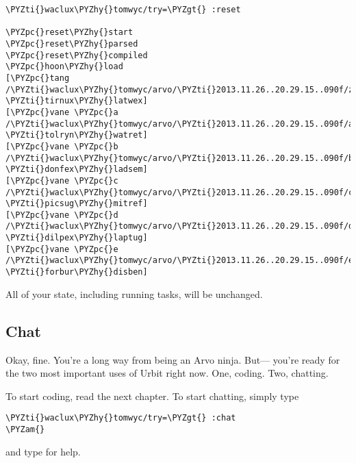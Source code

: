 \begin{framed_shaded}
\begin{Verbatim}[fontsize=\relsize{-2.5},fontseries=b,commandchars=\\\{\}]
\PYZti{}waclux\PYZhy{}tomwyc/try=\PYZgt{} :reset

\PYZpc{}reset\PYZhy{}start
\PYZpc{}reset\PYZhy{}parsed
\PYZpc{}reset\PYZhy{}compiled
\PYZpc{}hoon\PYZhy{}load
[\PYZpc{}tang /\PYZti{}waclux\PYZhy{}tomwyc/arvo/\PYZti{}2013.11.26..20.29.15..090f/zuse \PYZti{}tirnux\PYZhy{}latwex]
[\PYZpc{}vane \PYZpc{}a /\PYZti{}waclux\PYZhy{}tomwyc/arvo/\PYZti{}2013.11.26..20.29.15..090f/ames \PYZti{}tolryn\PYZhy{}watret]
[\PYZpc{}vane \PYZpc{}b /\PYZti{}waclux\PYZhy{}tomwyc/arvo/\PYZti{}2013.11.26..20.29.15..090f/batz \PYZti{}donfex\PYZhy{}ladsem]
[\PYZpc{}vane \PYZpc{}c /\PYZti{}waclux\PYZhy{}tomwyc/arvo/\PYZti{}2013.11.26..20.29.15..090f/clay \PYZti{}picsug\PYZhy{}mitref]
[\PYZpc{}vane \PYZpc{}d /\PYZti{}waclux\PYZhy{}tomwyc/arvo/\PYZti{}2013.11.26..20.29.15..090f/dill \PYZti{}dilpex\PYZhy{}laptug]
[\PYZpc{}vane \PYZpc{}e /\PYZti{}waclux\PYZhy{}tomwyc/arvo/\PYZti{}2013.11.26..20.29.15..090f/eyre \PYZti{}forbur\PYZhy{}disben]
\end{Verbatim}
\end{framed_shaded}

All of your state, including running tasks, will be unchanged.

\subsection{Chat}

Okay, fine.  You're a long way from being an Arvo ninja.  But---
you're ready for the two most important uses of Urbit right now.
One, coding.  Two, chatting.

To start coding, read the next chapter.  To start chatting,
simply type

\begin{framed_shaded}
\begin{Verbatim}[fontsize=\relsize{-2.5},fontseries=b,commandchars=\\\{\}]
\PYZti{}waclux\PYZhy{}tomwyc/try=\PYZgt{} :chat
\PYZam{}
\end{Verbatim}
\end{framed_shaded}

and type  for help.